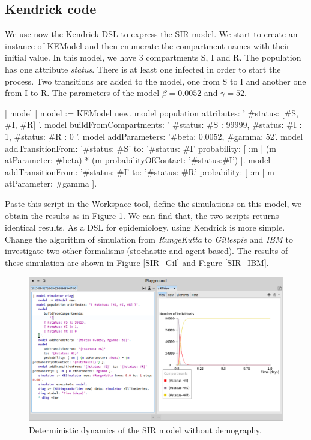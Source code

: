 \documentclass[a4paper,10pt,twoside]{book}
\begin{document}
\subsection{ Kendrick code}
We use now the Kendrick DSL to express the SIR model.
We start to create an instance of KEModel and then enumerate the compartment names with their initial value.
In this model, we have 3 compartments S, I and R. The population has one attribute \textit{status}.
There is at least one infected in order to start the process.
Two transitions are added to the model, one from S to I and another one from I to R.
The parameters of the model  $\beta = 0.0052$ and $\gamma=52$.


\begin{code}{}
| model |
	model := KEModel new.
  model population attributes: '{ #status: [#S, #I, #R] }'.
	model
		buildFromCompartments:
			'{
		{ #status: #S }: 99999,
		{ #status: #I }: 1,
		{ #status: #R }: 0
	}'.
	model addParameters: '{#beta: 0.0052, #gamma: 52}'.
	model
		addTransitionFrom: '{#status: #S}'
		to: '{#status: #I}'
		probability: [ :m | (m atParameter: #beta) * (m probabilityOfContact: '{#status:#I}') ].
	model addTransitionFrom: '{#status: #I}' to: '{#status: #R}' probability: [ :m | m atParameter: #gamma ].
\end{code}


Paste this script in the Workspace tool, define the simulations on this model, we obtain the results as in Figure \ref{SIR_RK4}.
We can find that, the two scripts returns identical results. As a DSL for epidemiology, using Kendrick is more simple.
Change the algorithm of simulation from \textit{RungeKutta} to \textit{Gillespie} and \textit{IBM} to investigate two other formalisms (stochastic and agent-based).
The results of these simulation are shown in Figure \ref{SIR_Gil} and Figure \ref{SIR_IBM}.


\begin{figure}

\begin{center}
\includegraphics[width=1.0\textwidth]{figures/SIR_RK4.png}\caption{Deterministic dynamics of the SIR model without demography.\label{SIR_RK4}}\end{center}
\end{figure}
\end{document}
